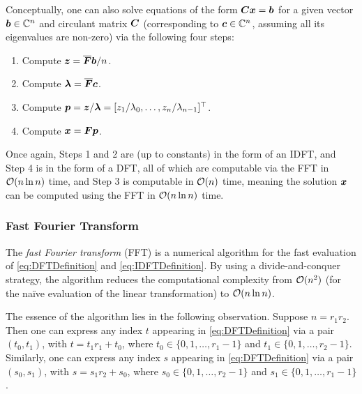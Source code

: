 Conceptually, one can also solve equations of the form \(\boldsymbol{Cx} = \boldsymbol{b}\) for a given vector \(\boldsymbol{b} \in \mathbb{C}^n\) and circulant matrix \(\boldsymbol{C}\) (corresponding to \(\boldsymbol{c} \in \mathbb{C}^n\), assuming all its eigenvalues are non-zero) via the following four steps:
\begin{enumerate}
	\item Compute \(\boldsymbol{z} = \overline{\boldsymbol{F}} \boldsymbol{b} / n\).
	\item Compute \(\boldsymbol{\lambda} = \overline{\boldsymbol{F}} \boldsymbol{c}\).
	\item Compute \(\boldsymbol{p} = \boldsymbol{z} / \boldsymbol{\lambda} = [z_1 / \lambda_0, \dots, z_n / \lambda_{n-1}]^\top\).
	\item Compute \(\boldsymbol{x} = \boldsymbol{Fp}\).
\end{enumerate}
Once again, Steps 1 and 2 are (up to constants) in the form of an IDFT, and Step 4 is in the form of a DFT, all of which are computable via the FFT in \(\mathcal{O}(n \ln n)\) time, and Step 3 is computable in \(\mathcal{O}(n)\) time, meaning the solution \(\boldsymbol{x}\) can be computed using the FFT in \(\mathcal{O}(n \ln n)\) time.

\subsubsection{Fast Fourier Transform}
The \textit{fast Fourier transform} (FFT) is a numerical algorithm for the fast evaluation of \eqref{eq:DFTDefinition} and \eqref{eq:IDFTDefinition}. By using a divide-and-conquer strategy, the algorithm reduces the computational complexity from \(\mathcal{O}(n^2)\) (for the naïve evaluation of the linear transformation) to \(\mathcal{O}(n \ln n)\).

The essence of the algorithm lies in the following observation. Suppose \(n = r_1 r_2\). Then one can express any index \(t\) appearing in \eqref{eq:DFTDefinition} via a pair \((t_0, t_1)\), with \(t = t_1 r_1 + t_0\), where \(t_0 \in \{0, 1, \dots, r_1 - 1\}\) and \(t_1 \in \{0, 1, \dots, r_2 - 1\}\). Similarly, one can express any index \(s\) appearing in \eqref{eq:DFTDefinition} via a pair \((s_0, s_1)\), with \(s = s_1 r_2 + s_0\), where \(s_0 \in \{0, 1, \dots, r_2 - 1\}\) and \(s_1 \in \{0, 1, \dots, r_1 - 1\}\).

